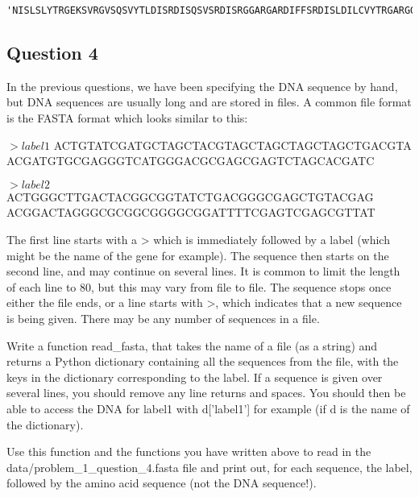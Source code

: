 \documentclass[11pt]{article}
\makeatletter
\newcommand{\boxspacing}{\kern\kvtcb@left@rule\kern\kvtcb@boxsep}
\newcommand{\prompt}[4]{
        \ttfamily\llap{{\color{#2}[#3]:\hspace{3pt}#4}}\vspace{-\baselineskip}
    }
\makeatother
\begin{document}
            \begin{tcolorbox}[breakable, size=fbox, boxrule=.5pt, pad at break*=1mm, opacityfill=0]
\prompt{Out}{outcolor}{55}{\boxspacing}
\begin{Verbatim}[commandchars=\\\{\}]
'NISLSLYTRGEKSVRGVSQSVYTLDISRDISQSVSRDISRGGARGARDIFFSRDISLDILCVYTRGARGGAL'
\end{Verbatim}
\end{tcolorbox}
        
    \subsection{Question 4}\label{question-4}

In the previous questions, we have been specifying the DNA sequence by
hand, but DNA sequences are usually long and are stored in files. A
common file format is the FASTA format which looks similar to this:

\(>label1\) ACTGTATCGATGCTAGCTACGTAGCTAGCTAGCTAGCTGACGTA
ACGATGTGCGAGGGTCATGGGACGCGAGCGAGTCTAGCACGATC

\(>label2\) ACTGGGCTTGACTACGGCGGTATCTGACGGGCGAGCTGTACGAG\n
ACGGACTAGGGCGCGGCGGGGCGGATTTTCGAGTCGAGCGTTAT

The first line starts with a \textgreater{} which is immediately
followed by a label (which might be the name of the gene for example).
The sequence then starts on the second line, and may continue on several
lines. It is common to limit the length of each line to 80, but this may
vary from file to file. The sequence stops once either the file ends, or
a line starts with \textgreater{}, which indicates that a new sequence
is being given. There may be any number of sequences in a file.

Write a function read\_fasta, that takes the name of a file (as a
string) and returns a Python dictionary containing all the sequences
from the file, with the keys in the dictionary corresponding to the
label. If a sequence is given over several lines, you should remove any
line returns and spaces. You should then be able to access the DNA for
label1 with d{[}'label1'{]} for example (if d is the name of the
dictionary).

Use this function and the functions you have written above to read in
the data/problem\_1\_question\_4.fasta file and print out, for each
sequence, the label, followed by the amino acid sequence (not the DNA
sequence!).
\end{document}
